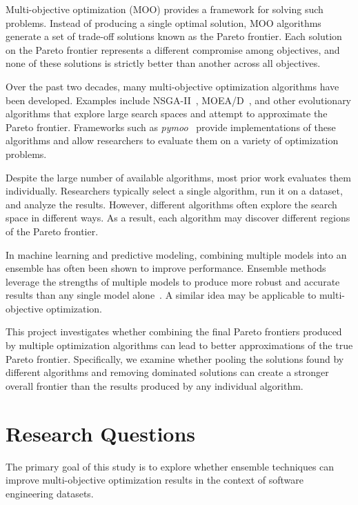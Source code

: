 \documentclass[sigconf,authorversion,nonacm]{acmart}
\begin{document}
Multi-objective optimization (MOO) provides a framework for solving such 
problems. Instead of producing a single optimal solution, MOO algorithms 
generate a set of trade-off solutions known as the Pareto frontier. Each 
solution on the Pareto frontier represents a different compromise among 
objectives, and none of these solutions is strictly better than another 
across all objectives.

Over the past two decades, many multi-objective optimization algorithms 
have been developed. Examples include NSGA-II~\cite{deb2002nsga2}, MOEA/D~\cite{zhang2007moead}, 
and other evolutionary algorithms that explore large search spaces and attempt 
to approximate the Pareto frontier. Frameworks such as \textit{pymoo}~\cite{blank2020pymoo} 
provide implementations of these algorithms and allow researchers to evaluate them 
on a variety of optimization problems.

Despite the large number of available algorithms, most prior work 
evaluates them individually. Researchers typically select a single 
algorithm, run it on a dataset, and analyze the results. However, 
different algorithms often explore the search space in different ways. 
As a result, each algorithm may discover different regions of the Pareto 
frontier.

In machine learning and predictive modeling, combining multiple models 
into an ensemble has often been shown to improve performance. Ensemble methods leverage the strengths of multiple models to produce more robust 
and accurate results than any single model alone~\cite{dietterich2000ensemble}. 
A similar idea may be applicable to multi-objective optimization.

This project investigates whether combining the final Pareto frontiers 
produced by multiple optimization algorithms can lead to better 
approximations of the true Pareto frontier. Specifically, we examine 
whether pooling the solutions found by different algorithms and removing 
dominated solutions can create a stronger overall frontier than the 
results produced by any individual algorithm.

\section{Research Questions}

The primary goal of this study is to explore whether ensemble techniques 
can improve multi-objective optimization results in the context of 
software engineering datasets.
\end{document}
